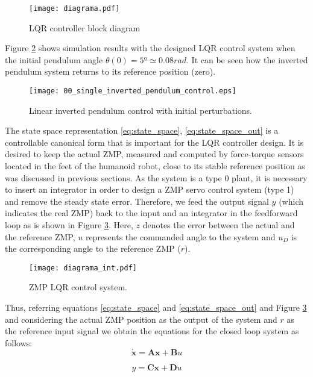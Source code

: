 \begin{figure}[!hbt]
\centering
\texttt{[image: diagrama.pdf]}
\caption{LQR controller block diagram}
\label{fig:block_diagram}
\end{figure}

Figure \ref{fig:pendulum_control} shows simulation results with the designed LQR control system when the initial pendulum angle $\theta(0)= 5º \simeq 0.08 rad$. It can be seen how the inverted pendulum system returns to its reference position (zero).

\begin{figure}[!hbt]
\centering
\texttt{[image: 00\_single\_inverted\_pendulum\_control.eps]}
\caption{Linear inverted pendulum control with initial perturbations.}
\label{fig:pendulum_control}
\end{figure}

The state space representation \ref{eq:state_space}, \ref{eq:state_space_out} is a controllable canonical form that is important for the LQR controller design. It is desired to keep the actual ZMP, measured and computed by force-torque sensors located in the feet of the humanoid robot, close to its stable reference position as was discussed in previous sections. As the system is a type 0 plant, it is necessary to insert an integrator in order to design a ZMP servo control system (type 1) and remove the steady state error. Therefore, we feed the output signal $y$ (which indicates the real ZMP) back to the input and an integrator in the feedforward loop as is shown in Figure \ref{fig:diagrama_int}. Here, $z$ denotes the error between the actual and the reference ZMP, $u$ represents the commanded angle to the system and $u_D$ is the corresponding angle to the reference ZMP ($r$).

\begin{figure}[!hbt]
\centering
\texttt{[image: diagrama\_int.pdf]}
\caption{ZMP LQR control system.}
\label{fig:diagrama_int}
\end{figure}

Thus, referring equations \ref{eq:state_space} and \ref{eq:state_space_out} and Figure \ref{fig:diagrama_int} and considering the actual ZMP position as the output of the system and $r$ as the reference input signal we obtain the equations for the closed loop system as follows:
\begin{equation}
\mathbf{\dot{x}} = \mathbf{A}\textbf{x} + \mathbf{B}u
\end{equation}

\begin{equation}
y = \textbf{C}\textbf{x} + \textbf{D}u
\end{equation}

